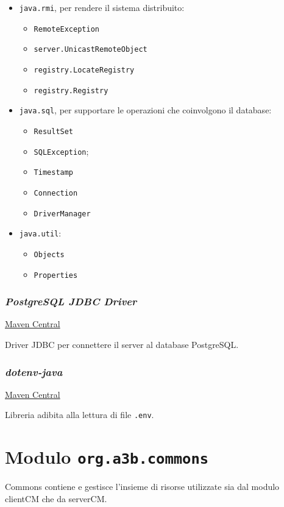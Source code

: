 \begin{itemize}
	\item \texttt{java.rmi}, per rendere il sistema distribuito:
		\begin{itemize}
			\item \texttt{RemoteException}
			\item \texttt{server.UnicastRemoteObject}
			\item \texttt{registry.LocateRegistry}
			\item \texttt{registry.Registry}
		\end{itemize}
	\item \texttt{java.sql}, per supportare le operazioni che coinvolgono il database:
		\begin{itemize}
			\item \texttt{ResultSet}
			\item \texttt{SQLException};
			\item \texttt{Timestamp}
			\item \texttt{Connection}
			\item \texttt{DriverManager}
		\end{itemize}
	\item \texttt{java.util}:
	\begin{itemize}
		\item \texttt{Objects}
		\item \texttt{Properties}
	\end{itemize}
\end{itemize}

\subsection{\textsl{PostgreSQL JDBC Driver}}

\href{https://mvnrepository.com/artifact/org.postgresql/postgresql/42.7.3}{Maven Central}

Driver JDBC per connettere il server al database PostgreSQL.

\subsection{\textsl{dotenv-java}}

\href{https://mvnrepository.com/artifact/io.github.cdimascio/dotenv-java/3.0.0}{Maven Central}
	
Libreria adibita alla lettura di file \texttt{.env}.

\chapter{Modulo \texttt{org.a3b.commons}}
\label{ch:commons}
Commons contiene e gestisce l'insieme di risorse utilizzate sia dal modulo clientCM che da serverCM.

